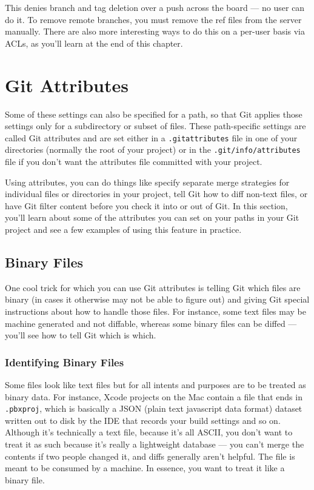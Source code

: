 \documentclass[a4paper]{book}
\newcounter{tab}[chapter]
\begin{document}
This denies branch and tag deletion over a push across the board --- no user can do it. To remove remote branches, you must remove the ref files from the server manually. There are also more interesting ways to do this on a per-user basis via ACLs, as you'll learn at the end of this chapter.

\section{Git Attributes}\label{git-attributes}

Some of these settings can also be specified for a path, so that Git applies those settings only for a subdirectory or subset of files. These path-specific settings are called Git attributes and are set either in a \texttt{.gitattributes} file in one of your directories (normally the root of your project) or in the \texttt{.git/info/attributes} file if you don't want the attributes file committed with your project.

Using attributes, you can do things like specify separate merge strategies for individual files or directories in your project, tell Git how to diff non-text files, or have Git filter content before you check it into or out of Git. In this section, you'll learn about some of the attributes you can set on your paths in your Git project and see a few examples of using this feature in practice.

\subsection{Binary Files}\label{binary-files}

One cool trick for which you can use Git attributes is telling Git which files are binary (in cases it otherwise may not be able to figure out) and giving Git special instructions about how to handle those files. For instance, some text files may be machine generated and not diffable, whereas some binary files can be diffed --- you'll see how to tell Git which is which.

\subsubsection{Identifying Binary Files}

Some files look like text files but for all intents and purposes are to be treated as binary data. For instance, Xcode projects on the Mac contain a file that ends in \texttt{.pbxproj}, which is basically a JSON (plain text javascript data format) dataset written out to disk by the IDE that records your build settings and so on. Although it's technically a text file, because it's all ASCII, you don't want to treat it as such because it's really a lightweight database --- you can't merge the contents if two people changed it, and diffs generally aren't helpful. The file is meant to be consumed by a machine. In essence, you want to treat it like a binary file.
\end{document}
